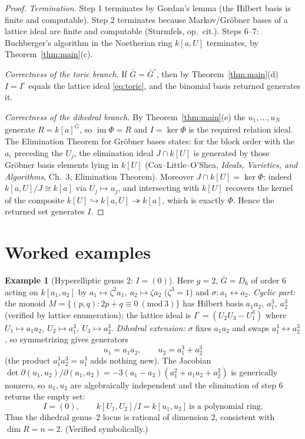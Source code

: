 \documentclass{amsart}
\theoremstyle{definition}
\newtheorem{example}[theorem]{Example}
\DeclareMathOperator{\im}{im}
\begin{document}
\begin{proof}
\emph{Termination.} Step 1 terminates by Gordan's lemma (the Hilbert basis is
finite and computable). Step 2 terminates because Markov/Gr\"obner bases of a
lattice ideal are finite and computable (Sturmfels, op.\ cit.). Steps 6--7:
Buchberger's algorithm in the Noetherian ring $k[a,U]$ terminates, by
Theorem~\ref{thm:main}(c).

\emph{Correctness of the toric branch.} If $\bar G=\bar G^{\circ}$, then by
Theorem~\ref{thm:main}(d) $I=I^{\circ}$ equals the lattice ideal \eqref{eq:toric},
and the binomial basis returned generates it.

\emph{Correctness of the dihedral branch.} By Theorem~\ref{thm:main}(e) the
$u_1,\dots,u_N$ generate $R=k[a]^{\bar G}$, so $\im\Phi=R$ and $I=\ker\Phi$ is the
required relation ideal. The Elimination Theorem for Gr\"obner bases states: for
the block order with the $a_i$ preceding the $U_j$, the elimination ideal
$J\cap k[U]$ is generated by those Gr\"obner basis elements lying in $k[U]$
(Cox--Little--O'Shea, \emph{Ideals, Varieties, and Algorithms}, Ch.~3,
Elimination Theorem). Moreover $J\cap k[U]=\ker\Phi$: indeed $k[a,U]/J\cong k[a]$
via $U_j\mapsto u_j$, and intersecting with $k[U]$ recovers the kernel of the
composite $k[U]\hookrightarrow k[a,U]\twoheadrightarrow k[a]$, which is exactly
$\Phi$. Hence the returned set generates $I$.
\end{proof}

\section{Worked examples}

\begin{example}[Hyperelliptic genus $2$: $I=(0)$]\label{ex:g2}
Here $g=2$, $\bar G=D_6$ of order $6$ acting on $k[a_1,a_2]$ by
$a_1\mapsto\zeta^2a_1,\ a_2\mapsto\zeta a_2$ ($\zeta^3=1$) and
$\sigma:a_1\leftrightarrow a_2$.
\emph{Cyclic part:} the monoid $M=\{(p,q):2p+q\equiv0\ (\mathrm{mod}\ 3)\}$ has
Hilbert basis $a_1a_2,\ a_1^3,\ a_2^3$ (verified by lattice enumeration); the
lattice ideal is $I^{\circ}=(U_2U_3-U_1^3)$ where $U_1\mapsto a_1a_2,\ U_2\mapsto
a_1^3,\ U_3\mapsto a_2^3$.
\emph{Dihedral extension:} $\sigma$ fixes $a_1a_2$ and swaps
$a_1^3\leftrightarrow a_2^3$, so symmetrizing gives generators
\[
 u_1=a_1a_2,\qquad u_2=a_1^3+a_2^3
\]
(the product $a_1^3 a_2^3=u_1^3$ adds nothing new). The Jacobian
$\det\partial(u_1,u_2)/\partial(a_1,a_2)=-3(a_1-a_2)(a_1^2+a_1a_2+a_2^2)$ is
generically nonzero, so $u_1,u_2$ are algebraically independent and the
elimination of step 6 returns the empty set:
\[
 \boxed{I=(0)},\qquad k[U_1,U_2]/I=k[u_1,u_2]\ \text{is a polynomial ring}.
\]
Thus the dihedral genus--$2$ locus is rational of dimension $2$, consistent with
$\dim R=n=2$. (Verified symbolically.)
\end{example}
\end{document}
